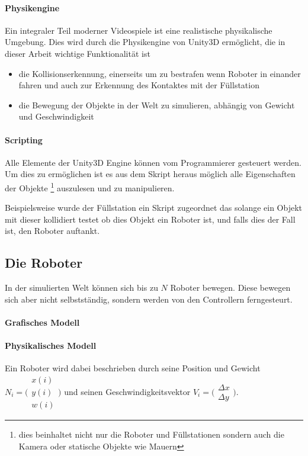 ﻿\documentclass[
    12pt,
    bibliography=totoc,
    ngerman
]{scrartcl}
\begin{document}
\paragraph{Physikengine}
Ein integraler Teil moderner Videospiele ist eine realistische physikalische Umgebung. Dies wird durch die Physikengine von Unity3D erm{\"{o}}glicht, die in dieser
Arbeit wichtige Funktionalit{\"{a}}t ist
\begin{itemize}
\item die Kollisionserkennung, einerseits um zu bestrafen wenn Roboter in einander fahren und auch zur Erkennung des Kontaktes mit der F{\"{u}}llstation
\item die Bewegung der Objekte in der Welt zu simulieren, abh{\"{a}}ngig von Gewicht und Geschwindigkeit
\end{itemize}

\paragraph{Scripting}
Alle Elemente der Unity3D Engine k{\"{o}}nnen vom Programmierer gesteuert werden. Um dies zu erm{\"{o}}glichen ist es aus dem Skript heraus m{\"{o}}glich alle Eigenschaften
der Objekte \footnote{dies beinhaltet nicht nur die Roboter und F{\"{u}}llstationen sondern auch die Kamera oder statische Objekte wie Mauern} auszulesen und zu manipulieren.

Beispielsweise wurde der F{\"{u}}llstation ein Skript zugeordnet das solange ein Objekt mit dieser kollidiert testet ob dies Objekt ein Roboter ist, und falls dies der Fall ist,
den Roboter auftankt.

\subsection{Die Roboter}\label{robot}
In der simulierten Welt k{\"{o}}nnen sich bis zu $N$ Roboter bewegen. Diese bewegen sich aber nicht selbstst{\"{a}}ndig, sondern werden von den Controllern ferngesteurt.
\paragraph{Grafisches Modell} 

\paragraph{Physikalisches Modell}
Ein Roboter wird dabei beschrieben durch seine Position und Gewicht
$ N_i = \bigl(\begin{smallmatrix} x(i) \\ y(i) \\ w(i) \end{smallmatrix}\bigr)$ und
seinen Geschwindigkeitsvektor
$ V_i = \bigl(\begin{smallmatrix} \Delta x \\ \Delta y \end{smallmatrix}\bigr)$.
\end{document}
